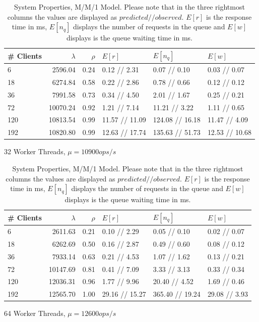 \documentclass[11pt,a4paper]{article}
\begin{document}
\begin{table}
    \begin{subtable}{1.0\linewidth}\centering
        \begin{tabular}{lrrlll}
        \hline
        \# Clients &  $\lambda$&  $\rho$& $E[r]$&        $E[n_q]$& $E[w]$\\
        \hline
          6 &    2596.04 &    0.24 &    0.12 // 2.31 &     0.07 // 0.10 &    0.03 // 0.07 \\
         18 &    6274.84 &    0.58 &    0.22 // 2.86 &     0.78 // 0.66 &    0.12 // 0.12 \\
         36 &    7991.58 &    0.73 &    0.34 // 4.50  &     2.01 // 1.67 &    0.25 // 0.21 \\
         72 &   10070.24 &    0.92 &    1.21 // 7.14 &    11.21 // 3.22 &    1.11 // 0.65 \\
        120 &   10813.54 &    0.99 &  11.57 // 11.09 &  124.08 // 16.18 &   11.47 // 4.09 \\
        192 &   10820.80 &    0.99 &  12.63 // 17.74 &  135.63 // 51.73 &  12.53 // 10.68 \\
        \hline
        \end{tabular}
        \caption{32 Worker Threads, $\mu = 10900 ops/s$}
    \end{subtable}
    
    \begin{subtable}{1.0\linewidth}\centering
        \begin{tabular}{lrrlll}
        \hline
        \# Clients &  $\lambda$&  $\rho$& $E[r]$&        $E[n_q]$&        $E[w]$\\
        \hline
          6 &    2611.63 &    0.21 &    0.10 // 2.29 &     0.05 // 0.10 &   0.02 // 0.07 \\
         18 &    6262.69 &    0.50 &    0.16 // 2.87 &     0.49 // 0.60 &   0.08 // 0.12 \\
         36 &    7933.14 &    0.63 &    0.21 // 4.53 &     1.07 // 1.62 &   0.13 // 0.21 \\
         72 &   10147.69 &    0.81 &    0.41 // 7.09 &     3.33 // 3.13 &   0.33 // 0.34 \\
        120 &   12036.31 &    0.96 &    1.77 // 9.96 &    20.40 // 4.52 &   1.69 // 0.46 \\
        192 &   12565.70 &    1.00 &  29.16 // 15.27 &  365.40 // 19.24 &  29.08 // 3.93 \\
        \hline
        \end{tabular}
        \caption{64 Worker Threads, $\mu = 12600 ops/s$}
    \end{subtable}

    \caption{System Properties, M/M/1 Model. Please note that in the three rightmost columns the values are displayed as $predicted  //  observed$. $E[r]$ is the response time in ms,  $E[n_q]$ displays the number of requests in the queue and $E[w]$ displays is the queue waiting time in ms. }
    \label{mm1}
\end{table}
\end{document}
